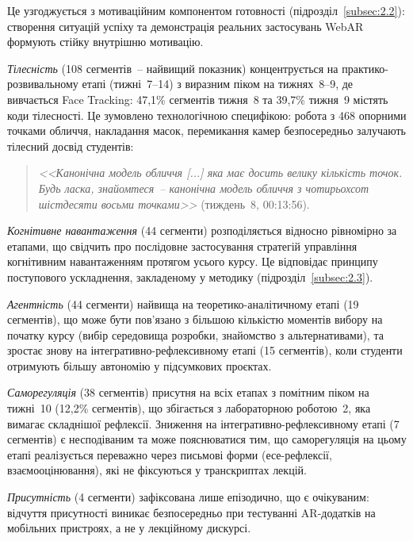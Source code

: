 Це узгоджується з мотиваційним компонентом готовності (підрозділ~\ref{subsec:2.2}): створення ситуацій успіху та демонстрація реальних застосувань WebAR формують стійку внутрішню мотивацію.

\textit{Тілесність} (108 сегментів~-- найвищий показник) концентрується на практико-розвивальному етапі (тижні~7--14) з виразним піком на тижнях~8--9, де вивчається Face Tracking: 47,1\% сегментів тижня~8 та 39,7\% тижня~9 містять коди тілесності. Це зумовлено технологічною специфікою: робота з 468 опорними точками обличчя, накладання масок, перемикання камер безпосередньо залучають тілесний досвід студентів:

\begin{quote}
\textit{<<Канонічна модель обличчя \textnormal{[...]} яка має досить велику кількість точок. Будь ласка, знайомтеся~-- канонічна модель обличчя з чотирьохсот шістдесяти восьми точками>>} (тиждень~8, 00:13:56).
\end{quote}

\textit{Когнітивне навантаження} (44 сегменти) розподіляється відносно рівномірно за етапами, що свідчить про послідовне застосування стратегій управління когнітивним навантаженням протягом усього курсу. Це відповідає принципу поступового ускладнення, закладеному у методику (підрозділ~\ref{subsec:2.3}).

\textit{Агентність} (44 сегменти) найвища на теоретико-аналітичному етапі (19 сегментів), що може бути пов'язано з більшою кількістю моментів вибору на початку курсу (вибір середовища розробки, знайомство з альтернативами), та зростає знову на інтегративно-рефлексивному етапі (15 сегментів), коли студенти отримують більшу автономію у підсумкових проєктах.

\textit{Саморегуляція} (38 сегментів) присутня на всіх етапах з помітним піком на тижні~10 (12,2\% сегментів), що збігається з лабораторною роботою~2, яка вимагає складнішої рефлексії. Зниження на інтегративно-рефлексивному етапі (7 сегментів) є несподіваним та може пояснюватися тим, що саморегуляція на цьому етапі реалізується переважно через письмові форми (есе-рефлексії, взаємооцінювання), які не фіксуються у транскриптах лекцій.

\textit{Присутність} (4 сегменти) зафіксована лише епізодично, що є очікуваним: відчуття присутності виникає безпосередньо при тестуванні AR-додатків на мобільних пристроях, а не у лекційному дискурсі.


